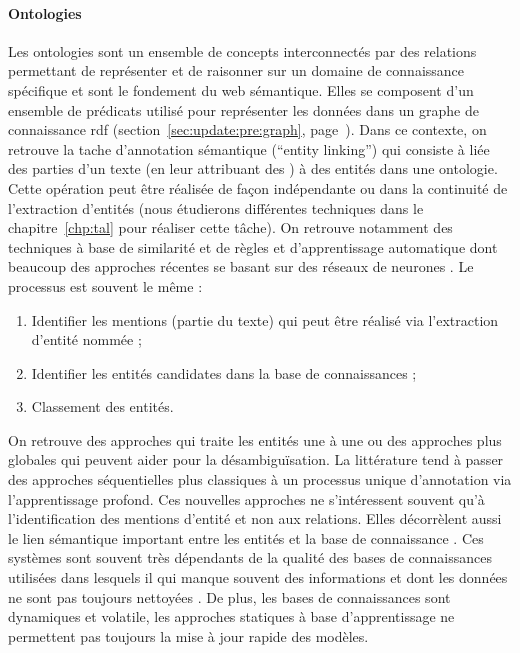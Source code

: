 \paragraph{Ontologies}
Les ontologies sont un ensemble de concepts interconnectés par des relations permettant de représenter et de raisonner sur un domaine de connaissance spécifique et sont le fondement du web sémantique.
Elles se composent d'un ensemble de prédicats utilisé pour représenter les données dans un graphe de connaissance \acrshort{rdf} (section~\ref{sec:update:pre:graph}, page~\pageref{sec:update:pre:graph}).
Dans ce contexte, on retrouve la tache d'annotation sémantique (\enquote{entity linking}) qui consiste à liée des parties d'un texte (en leur attribuant des ) à des entités dans une ontologie.
Cette opération peut être réalisée de façon indépendante ou dans la continuité de l'extraction d'entités \cite{al-moslmiNamedEntityExtraction2020} (nous étudierons différentes techniques dans le chapitre~\ref{chp:tal} pour réaliser cette tâche).
On retrouve notamment des techniques à base de similarité et de règles \cite{liuDBpediaBasedEntityLinking2018,amaviNaturalLanguageQuerying2020} et d'apprentissage automatique \cite{shenProbabilisticModelLinking2014,fanLinkingEntitiesRelations2024} dont beaucoup des approches récentes se basant sur des réseaux de neurones \cite{mondalMedicalEntityLinking2019,sakorFalconEntityRelation2020,liEfficientOnePassEndtoEnd2020,bellatrecheNewTrendsDatabase2021,navigliWordSenseDisambiguation2024}.
Le processus est souvent le même :
\begin{enumerate}
    \item Identifier les mentions (partie du texte) qui peut être réalisé via l'extraction d'entité nommée ;
    \item Identifier les entités candidates dans la base de connaissances ;
    \item Classement des entités.
\end{enumerate}
On retrouve des approches qui traite les entités une à une ou des approches plus globales qui peuvent aider pour la désambiguïsation.
La littérature tend à passer des approches séquentielles plus classiques à un processus unique d'annotation via l'apprentissage profond.
Ces nouvelles approches ne s'intéressent souvent qu'à l'identification des mentions d'entité et non aux relations.
Elles décorrèlent aussi le lien sémantique important entre les entités et la base de connaissance \cite{huEntityLinkingSymmetrical2019}.
Ces systèmes sont souvent très dépendants de la qualité des bases de connaissances utilisées dans lesquels il qui manque souvent des informations et dont les données ne sont pas toujours nettoyées \cite{weichselbraunMiningLeveragingBackground2018}.
De plus, les bases de connaissances sont dynamiques et volatile, les approches statiques à base d'apprentissage ne permettent pas toujours la mise à jour rapide des modèles.

